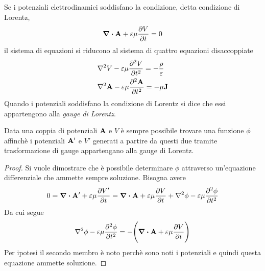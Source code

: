 Se i potenziali elettrodinamici soddisfano la condizione, detta condizione di Lorentz,
    \begin{equation}
        \label{eqn:condizione_lorentz}
        \div{\vb{A}}+\varepsilon\mu\pdv{V}{t}=0
    \end{equation}
il sistema di equazioni si riducono al sistema di quattro equazioni disaccoppiate
    \begin{equation}
        \label{eqn:potenziali_maxwell}
        \begin{split}
            &\laplacian{V}-\epsilon\mu \pdv[2]{V}{t}=-\frac{\rho}{\epsilon}\\
            &\laplacian{\vb{A}}-\epsilon\mu \pdv[2]{\vb{A}}{t}=-\mu\vb{J}
        \end{split}
   \end{equation}
Quando i potenziali soddisfano la condizione di Lorentz si dice che essi appartengono alla \textit{gauge di Lorentz}.
\begin{thm}
    Data una coppia di potenziali $\vb{A}$ e $V$ è sempre possibile trovare una funzione $\phi$ affinchè i potenziali $\vb
    {A}'$ e $V'$ generati a partire da questi due tramite trasformazione di gauge appartengano alla gauge di Lorentz.
\end{thm}
\begin{proof}
    Si vuole dimostrare che è possibile determinare $\phi$ attraverso un'equazione differenziale che ammette sempre soluzione.
    Bisogna avere
    \[
        0= \div{\vb{A}'}+\epsilon\mu\pdv{V'}{t}=\div{\vb{A}}+\epsilon\mu\pdv{V}{t}+\laplacian{\phi}-\epsilon\mu\pdv[2]{\phi}{t}
    \]
    Da cui segue
    \[
        \laplacian{\phi}-\epsilon\mu\pdv[2]{\phi}{t}= -\Biggl( \div{\vb{A}}+\epsilon\mu\pdv{V}{t} \Biggr)
    \]
    Per ipotesi il secondo membro è noto perchè sono noti i potenziali e quindi questa equazione ammette soluzione.
\end{proof}


